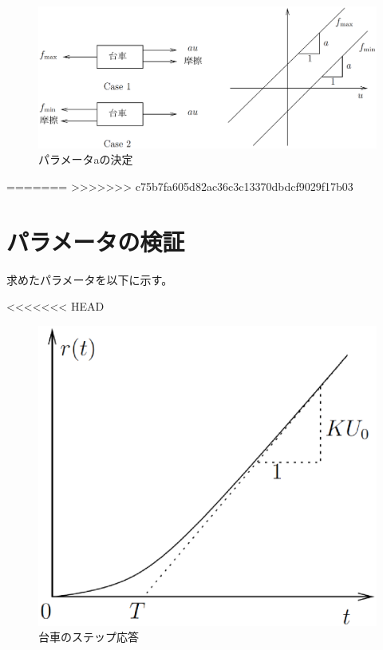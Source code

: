 \documentclass[a4j,11pt,twoside]{ujbook}
\begin{document}
\begin{figure}[htbp]
	\begin{center}
		\includegraphics[width = 0.8 \linewidth]{definition_a.eps}
		\caption{パラメータaの決定}
		\label{fig:パラメータaの決定}
	\end{center}
\end{figure}
=======
>>>>>>> c75b7fa605d82ac36c3c13370dbdcf9029f17b03

\section{パラメータの検証}
求めたパラメータを以下に示す。

<<<<<<< HEAD
\begin{figure}[htbp]
	\begin{center}
		\includegraphics[width = 0.6 \linewidth]{cart_step.eps}
		\caption{台車のステップ応答}
		\label{fig:台車のステップ応答}
	\end{center}
\end{figure}
\end{document}
